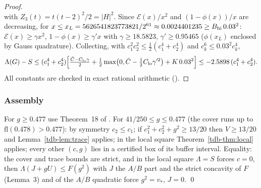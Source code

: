\begin{proof}
\[\]
with $Z_3(t)=t(t-2)^2/2=|H|^2$. Since $\mathcal E(x)/x^2$ and $(1-\phi(x))/x$ are decreasing, for $x\le x_L=5626541823773821/2^{61}\approx0.0024401235\ge B_{\rm hi}\,0.03^2$:
$\mathcal E(x)\ge\gamma x^2$, $1-\phi(x)\ge\gamma'x$ with $\gamma\ge18.5823$, $\gamma'\ge0.95465$ ($\phi(x_L)$ enclosed by Gauss quadrature).
Collecting, with $c_1^2c_2^2\le\frac12(c_1^4+c_2^4)$ and $c_k^6\le0.03^2c_k^4$,
\[
\Lambda(G)-S\le(c_1^4+c_2^4)\Bigl[\tfrac{\bar C-C_{\rm lo}\gamma}{2}+\tfrac12\max\bigl(0,\bar C-\tfrac12C_{\rm lo}\gamma'^2\bigr)+K\,0.03^2\Bigr]\le-2.5898\,(c_1^4+c_2^4).
\]
All constants are checked in exact rational arithmetic ().
\end{proof}

\subsubsection{Assembly}
For $g\ge0.477$ use Theorem~18 of \Sd. For $41/250\le g\le0.477$ (the cover runs up to $\mathrm{fl}(0.478)>0.477$): by symmetry $c_2\le c_1$; if $c_1^2+c_2^2+g^2\ge13/20$ then $V\ge13/20$ and
Lemma~\ref{tdb-lem:trace} applies; in the local square Theorem~\ref{tdb-thm:local} applies; every other $(c,g)$ lies in a certified box of its buffer
interval. Equality: the cover and trace bounds are strict, and in the local square $\Lambda=S$ forces $c=0$, then
$\Lambda(J+gU)\le F(g^2)$ with $J$ the $A/B$ part and the strict concavity of $F$ (Lemma~3) and of the $A/B$ quadratic force $g^2=v_*$, $J=0$.
\qed

